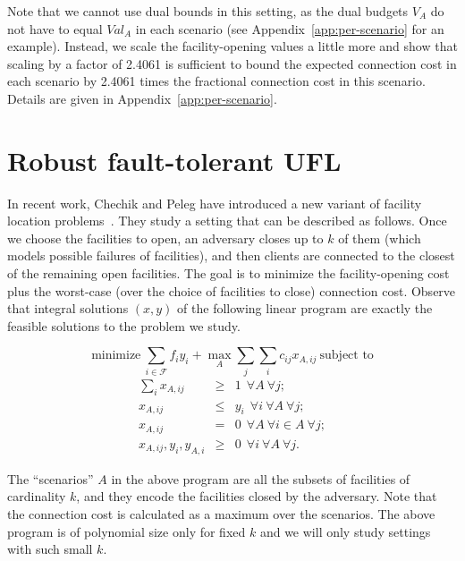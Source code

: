 \documentclass[11pt]{article}
\begin{document}
Note that we cannot use dual bounds in this setting, as the dual budgets $V_A$
do not have to equal $Val_A$ in each scenario (see Appendix~\ref{app:per-scenario} for an example).
Instead, we scale the facility-opening values a little more and show that scaling by a factor of 2.4061 is
sufficient to bound the expected connection cost in each scenario by 2.4061 times the fractional connection
cost in this scenario. Details are given in Appendix~\ref{app:per-scenario}.


\section{Robust fault-tolerant UFL}
In recent work, Chechik and Peleg
have introduced a new variant of facility location 
problems~\cite{DBLP:conf/stacs/ChechikP10}.
They study a setting that can be described as follows. Once we choose the facilities to open, an adversary closes up to $k$ of them
(which models possible failures of facilities), and then clients are connected to the closest of the remaining open facilities. 
The goal is to minimize the facility-opening cost plus the worst-case (over the choice of facilities to close) connection cost.
Observe that integral solutions $(x,y)$ of the following linear program are exactly the feasible solutions
to the problem we study.

\begin{equation} \label{eqn:rf0}
 \mbox{minimize} ~
\sum_{i \in \mathcal{F}} f_i y_i +
\max_A \sum_{j} \sum_i c_{ij} x_{A,ij}~
\mbox{subject to} 
\end{equation}
\begin{eqnarray}
\sum_i x_{A,ij} & \geq & 1 ~~\forall A ~\forall j; 
\label{eqn:rf1} \\
x_{A,ij} & \leq & y_i  ~~\forall i ~\forall A ~\forall j ; 
\label{eqn:rf2} \\
x_{A,ij} & = & 0  ~~\forall A ~\forall i \in A ~\forall j ; 
\label{eqn:rf3} \\
x_{A,ij}, y_i, y_{A,i} & \geq & 0 ~~\forall i ~\forall A ~\forall j.
\nonumber
\end{eqnarray}


The ``scenarios'' $A$ in the above program are all the subsets of facilities of cardinality $k$,
and they encode the facilities closed by the adversary.
Note that the connection cost is calculated as a maximum over the scenarios.
The above program is of polynomial size only for fixed $k$ and we will only study settings with such small $k$.
\end{document}

